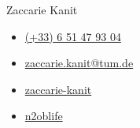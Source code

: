 \hspace*{-2mm}
\vspace{-5mm}
\begin{center}
    {\fontsize{24pt}{24pt}\selectfont Zaccarie Kanit}
\end{center}
\vspace{2mm}
\begin{itemize}[noitemsep]
    \item[\faPhone] \href{tel:+33651479304}{(+33) 6 51 47 93 04}
    \item[\faAt] \href{mailto:zaccarie.kanit@tum.de}{zaccarie.kanit@tum.de}
    \item[\faLinkedin] \href{https://www.linkedin.com/in/zaccarie-kanit/}{zaccarie-kanit}
    \item[\faGithub] \href{https://github.com/n2oblife}{n2oblife}
    \end{itemize}
\vspace{2mm}
